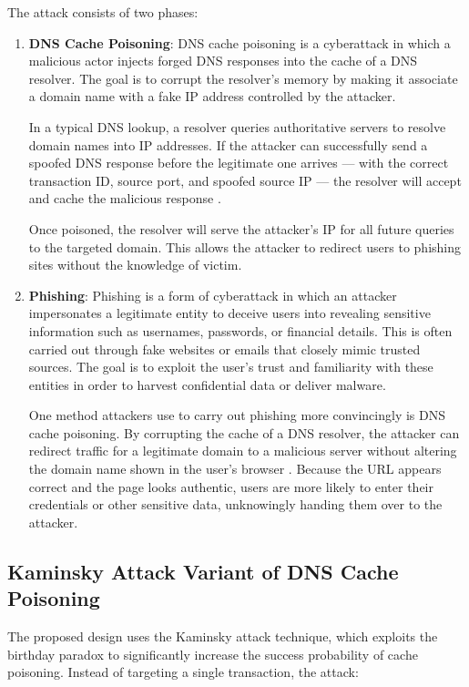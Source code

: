 \documentclass[12pt,a4paper]{article}
\begin{document}
The attack consists of two phases:
\begin{enumerate}
    \item \textbf{DNS Cache Poisoning}: DNS cache poisoning is a cyberattack in which a malicious actor injects forged DNS responses into the cache of a DNS resolver. The goal is to corrupt the resolver's memory by making it associate a domain name with a fake IP address controlled by the attacker.
    
In a typical DNS lookup, a resolver queries authoritative servers to resolve domain names into IP addresses. If the attacker can successfully send a spoofed DNS response before the legitimate one arrives — with the correct transaction ID, source port, and spoofed source IP — the resolver will accept and cache the malicious response \cite{rfc1035}.

Once poisoned, the resolver will serve the attacker’s IP for all future queries to the targeted domain. This allows the attacker to redirect users to phishing sites without the knowledge of victim.

    \item \textbf{Phishing}: Phishing is a form of cyberattack in which an attacker impersonates a legitimate entity to deceive users into revealing sensitive information such as usernames, passwords, or financial details. This is often carried out through fake websites or emails that closely mimic trusted sources. The goal is to exploit the user’s trust and familiarity with these entities in order to harvest confidential data or deliver malware. 

One method attackers use to carry out phishing more convincingly is DNS cache poisoning. By corrupting the cache of a DNS resolver, the attacker can redirect traffic for a legitimate domain to a malicious server without altering the domain name shown in the user's browser . Because the URL appears correct and the page looks authentic, users are more likely to enter their credentials or other sensitive data, unknowingly handing them over to the attacker. 
\end{enumerate}

\subsection{Kaminsky Attack Variant of DNS Cache Poisoning}

The proposed design uses the Kaminsky attack technique, which exploits the birthday paradox to significantly increase the success probability of cache poisoning. Instead of targeting a single transaction, the attack\cite{rfc4033}:
\end{document}
